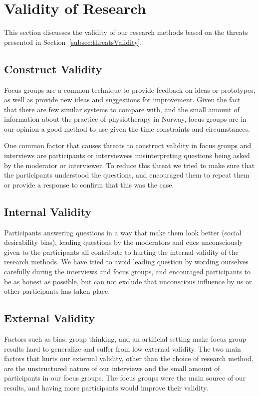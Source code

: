 \section{Validity of Research}
This section discusses the validity of our research methods based on the threats presented in Section~\ref{subsec:threatsValidity}.

\subsection{Construct Validity}

Focus groups are a common technique to provide feedback on ideas or prototypes, as well as provide new ideas and suggestions for improvement. Given the fact that there are few similar systems to compare with, and the small amount of information about the practice of physiotherapy in Norway, focus groups are in our opinion a good method to use given the time constraints and circumstances.

One common factor that causes threats to construct validity in focus groups and interviews are participants or interviewees misinterpreting questions being asked by the moderator or interviewer. To reduce this threat we tried to make sure that the participants understood the questions, and encouraged them to repeat them or provide a response to confirm that this was the case.

\subsection{Internal Validity}
Participants answering questions in a way that make them look better (social desirability bias), leading questions by the moderators and cues unconsciously given to the participants all contribute to hurting the internal validity of the research methods. We have tried to avoid leading question by wording ourselves carefully during the interviews and focus groups, and encouraged participants to be as honest as possible, but can not exclude that unconscious influence by us or other participants has taken place.

\subsection{External Validity}
Factors such as bias, group thinking, and an artificial setting make focus group results hard to generalize and suffer from low external validity. The two main factors that hurts our external validity, other than the choice of research method, are the unstructured nature of our interviews and the small amount of participants in our focus groups. The focus groups were the main source of our results, and having more participants would improve their validity.

